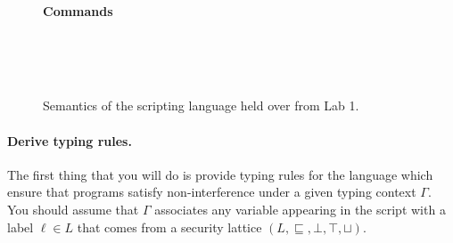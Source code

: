\documentclass[11pt]{article}
\begin{document}
{\begin{figure}[t]
\textbf{Commands}
\begin{center}
\quad
{}
\quad
{}
\\[1ex]
\quad
{}
\\[1ex]
\quad
{}
\quad
{}
\\[1ex]
\quad
{}
\end{center}

\caption{Semantics of the scripting language held over from Lab 1.}
\label{fig:semantics}
\end{figure}

\paragraph{Derive typing rules.} The first thing that you will do is provide typing rules for the language 
which ensure that programs satisfy non-interference under a given typing context $\Gamma$. You should assume
 that $\Gamma$ associates any variable appearing in the script with a label $\ell \in L$ that comes from a 
 security lattice $(L, \sqsubseteq, \bot, \top, \sqcup)$. 

}
\end{document}
